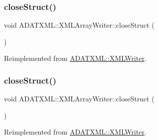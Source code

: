 \subsubsection{\texorpdfstring{closeStruct()}{closeStruct()}\hspace{0.1cm}{\footnotesize\ttfamily [1/2]}}
{\footnotesize\ttfamily void A\+D\+A\+T\+X\+M\+L\+::\+X\+M\+L\+Array\+Writer\+::close\+Struct (\begin{DoxyParamCaption}{ }\end{DoxyParamCaption})\hspace{0.3cm}{\ttfamily [virtual]}}



Reimplemented from \mbox{\hyperlink{classADATXML_1_1XMLWriter_ade5512a07806893fe3aaebb897580569}{A\+D\+A\+T\+X\+M\+L\+::\+X\+M\+L\+Writer}}.

\mbox{\label{classADATXML_1_1XMLArrayWriter_a5a849f8851bce99654c44dc08b1fe486}} 
\subsubsection{\texorpdfstring{closeStruct()}{closeStruct()}\hspace{0.1cm}{\footnotesize\ttfamily [2/2]}}
{\footnotesize\ttfamily void A\+D\+A\+T\+X\+M\+L\+::\+X\+M\+L\+Array\+Writer\+::close\+Struct (\begin{DoxyParamCaption}{ }\end{DoxyParamCaption})\hspace{0.3cm}{\ttfamily [virtual]}}



Reimplemented from \mbox{\hyperlink{classADATXML_1_1XMLWriter_ade5512a07806893fe3aaebb897580569}{A\+D\+A\+T\+X\+M\+L\+::\+X\+M\+L\+Writer}}.

